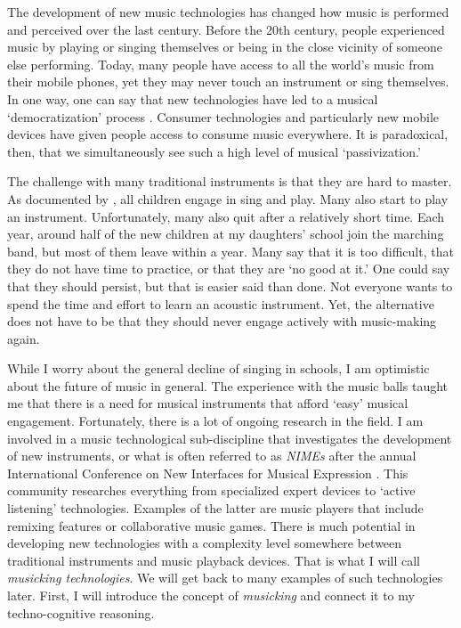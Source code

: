 The development of new music technologies has changed how music is performed and perceived over the last century. Before the 20th century, people experienced music by playing or singing themselves or being in the close vicinity of someone else performing. Today, many people have access to all the world's music from their mobile phones, yet they may never touch an instrument or sing themselves. In one way, one can say that new technologies have led to a musical `democratization' process \citep{theberge_any_1997}. Consumer technologies and particularly new mobile devices have given people access to consume music everywhere. It is paradoxical, then, that we simultaneously see such a high level of musical `passivization.'

The challenge with many traditional instruments is that they are hard to master. As documented by \citet{bjorkvold_muse_1992}, all children engage in sing and play. Many also start to play an instrument. Unfortunately, many also quit after a relatively short time. Each year, around half of the new children at my daughters' school join the marching band, but most of them leave within a year. Many say that it is too difficult, that they do not have time to practice, or that they are `no good at it.' One could say that they should persist, but that is easier said than done. Not everyone wants to spend the time and effort to learn an acoustic instrument. Yet, the alternative does not have to be that they should never engage actively with music-making again.

While I worry about the general decline of singing in schools, I am optimistic about the future of music in general. The experience with the music balls taught me that there is a need for musical instruments that afford `easy' musical engagement. Fortunately, there is a lot of ongoing research in the field. I am involved in a music technological sub-discipline that investigates the development of new instruments, or what is often referred to as \emph{NIMEs} after the annual International Conference on New Interfaces for Musical Expression \citep{jensenius_nime_2017}. This community researches everything from specialized expert devices to `active listening' technologies. Examples of the latter are music players that include remixing features or collaborative music games. There is much potential in developing new technologies with a complexity level somewhere between traditional instruments and music playback devices. That is what I will call \emph{musicking technologies}. We will get back to many examples of such technologies later. First, I will introduce the concept of \emph{musicking} and connect it to my techno-cognitive reasoning.


